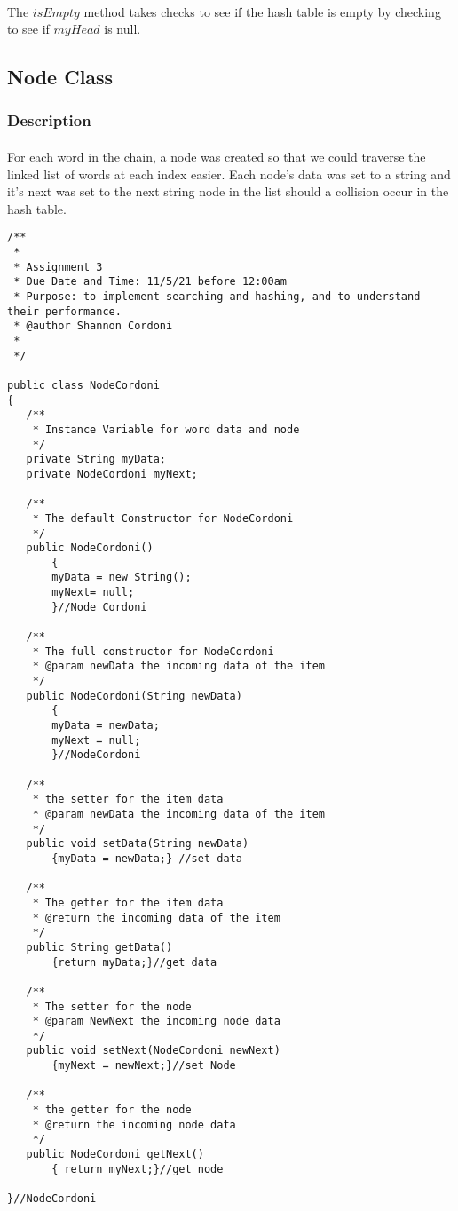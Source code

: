 \documentclass[letterpaper, 10pt,DIV=13]{scrartcl}
\numberwithin{equation}{section} %
\numberwithin{figure}{section} %
\numberwithin{table}{section} %
\begin{document}
\paragraph{} The $isEmpty$ method takes checks to see if the hash table is empty by checking to see if $myHead$ is null.


\subsection{Node Class}

\subsubsection{Description}
\paragraph{} For each word in the chain, a node was created so that we could traverse the linked list of words at each index easier. Each node's data was set to a string and it's next was set to the next string node in the list should a collision occur in the hash table.

\lstset{numbers=left, numberstyle=\tiny, stepnumber=1, numbersep=5pt, basicstyle=\footnotesize\ttfamily}
\begin{lstlisting}[frame=single, ]
/** 
 * 
 * Assignment 3
 * Due Date and Time: 11/5/21 before 12:00am 
 * Purpose: to implement searching and hashing, and to understand their performance.
 * @author Shannon Cordoni 
 * 
 */

public class NodeCordoni 
{
   /**
    * Instance Variable for word data and node 
    */
   private String myData;
   private NodeCordoni myNext;
   
   /**
    * The default Constructor for NodeCordoni
    */
   public NodeCordoni()
       {
       myData = new String();
       myNext= null;
       }//Node Cordoni
   
   /**
    * The full constructor for NodeCordoni
    * @param newData the incoming data of the item
    */
   public NodeCordoni(String newData)
       {
       myData = newData;
       myNext = null;
       }//NodeCordoni
   
   /**
    * the setter for the item data
    * @param newData the incoming data of the item
    */
   public void setData(String newData)
       {myData = newData;} //set data
   
   /**
    * The getter for the item data
    * @return the incoming data of the item
    */
   public String getData()
       {return myData;}//get data
   
   /**
    * The setter for the node
    * @param NewNext the incoming node data
    */
   public void setNext(NodeCordoni newNext)
       {myNext = newNext;}//set Node
   
   /**
    * the getter for the node
    * @return the incoming node data
    */
   public NodeCordoni getNext()
       { return myNext;}//get node

}//NodeCordoni
\end{lstlisting}
\end{document}
